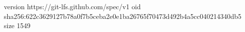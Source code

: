 version https://git-lfs.github.com/spec/v1
oid sha256:622c3629127b78a0f7b5ceba2e0e1ba26765f70473d492b4a5cc040214340db5
size 1549
